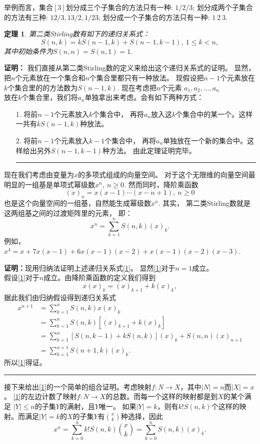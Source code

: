 \documentclass[a4paper,11pt,twoside]{book}
\newtheorem{thm}{定理}[section]
\def\qed{\nopagebreak\hfill{\rule{4pt}{7pt}}\medbreak}
\begin{document}
举例而言，集合$[3]$划分成三个子集合的方法只有一种: $1/2/3$;
划分成两个子集合的方法有三种: $12/3,13/2,1/23$;
划分成一个子集合的方法只有一种: $1\ 2\ 3$.


\begin{thm}
第二类Stirling数有如下的递归关系式：
\begin{equation}S(n,k)=kS(n-1,k)+S(n-1,k-1),\ 1\le k<n,\end{equation}
其中初始条件为$S(n,n)=S(n,1)=1.$
\end{thm}
{\bf 证明：}
我们直接从第二类Stirling数的定义来给出这个递归关系式的证明。
显然，把$n$个元素放在一个集合和$n$个集合里都只有一种放法。
现假设把$n-1$个元素放在$k$个集合里的的方法数为$S(n-1,k).$
现在考虑把$n$个元素 $a_1, a_2, \ldots,
a_n$\\放在$k$个集合里，我们将$a_n$单独拿出来考虑。会有如下两种方式：
\begin{itemize}
\item[1. ]将前$n-1$个元素放入$k$个集合中，
再将$a_n$放入这$k$个集合中的某一个。这样一共有$kS(n-1,k)$种放法。
\item[2. ]将前$n-1$个元素放入$k-1$个集合中，
再将$a_n$单独放在一个新的集合中。这样给出另外$S(n-1,k-1)$种方法。
由此定理证明完毕。\qed
\end{itemize}

现在我们考虑由变量为$x$的多项式组成的向量空间。
对于这个无限维的向量空间最明显的一组基是单项式幂级数$x^n,\  n\geq
0.$ 然而同时，降阶乘函数
$$(x)_n=x(x-1)\cdots(x-n+1),\ n\geq 0$$
也是这个向量空间的一组基，自然能生成幂级数$x^n.$ 其实，
第二类Stirling数就是这两组基之间的过渡矩阵里的元素， 即：
\begin{equation}
x^n=\sum_{k=1}^nS(n,k)(x)_k.\label{1}
\end{equation}
例如，$x^4=x+7x(x-1)+6x(x-1)(x-2)+x(x-1)(x-2)(x-3)$.

{\bf 证明：}现用归纳法证明上述递归关系式\ref{1}。
显然\ref{1}对于$n=1$成立。 \\
假设\ref{1}对于$n$成立。由降阶乘函数的定义我们得到
$$x(x)_k=(x)_{k+1}+k(x)_k,$$
据此我们由归纳假设得到递归关系式
\begin{align*}
x^{n+1}&=\sum_{k=1}^nS(n,k)x(x)_k\\
&=\sum_{k=1}^n S(n,k)[(x)_{k+1}+k(x)_k]\\
&=\sum_{k=1}^{n}[S(n,k-1)+kS(n,k)](x)_k+S(n,n)(x)_{n+1}\\
&=\sum_{k=1}^{n+1}S(n+1,k)(x)_k.
\end{align*}
所以\ref{1}得证。\qed

接下来给出\ref{1}的一个简单的组合证明。考虑映射$f:N\rightarrow
X$，其中$|N|=n$而$|X|=x$。 \ref{1}的左边计数了映射$f:N\rightarrow
X$的总数。而每一个这样的映射都是到$X$的某个满足 $|Y|\leq
n$的子集$Y$的满射，且$Y$唯一。
如果$|Y|=k$，则有$k!S(n,k)$个这样的映射。而满足$|Y|=k$的$X$的子集$Y$有${x\choose
k}$种选择，因此
$$x^n=\sum_{k=0}^nk!S(n,k){x\choose k}=\sum_{k=0}^nS(n,k)(x)_k.$$
\end{document}
